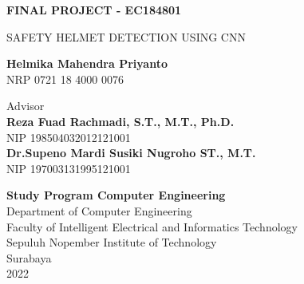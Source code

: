 \begin{flushleft}
  \fontsize{14pt}{17}
  \selectfont
  \textbf{FINAL PROJECT - EC184801}
\end{flushleft}


\vspace{5ex}

\begin{flushleft}
  \fontsize{18pt}{22}
  \selectfont
  SAFETY HELMET DETECTION USING CNN
\end{flushleft}

\vspace{6ex}

\begin{flushleft}
  \fontsize{14pt}{17}
  \selectfont
  \textbf{Helmika Mahendra Priyanto}
  \\
  NRP 0721 18 4000 0076
\end{flushleft}

\vspace{6ex}

\begin{flushleft}
  \fontsize{14pt}{17}
  \selectfont
  Advisor \\
  \textbf{Reza Fuad Rachmadi, S.T., M.T., Ph.D.} \\
  NIP 198504032012121001 \\
  \textbf{Dr.Supeno Mardi Susiki Nugroho ST., M.T.} \\
  NIP 197003131995121001 \\
\end{flushleft}

\vspace{6ex}

\begin{flushleft}
  \fontsize{12pt}{15}
  \selectfont
  \textbf{Study Program Computer Engineering}\\
  Department of Computer Engineering\\
  Faculty of Intelligent Electrical and Informatics Technology\\
  Sepuluh Nopember Institute of Technology\\
  Surabaya\\
  2022
\end{flushleft}
